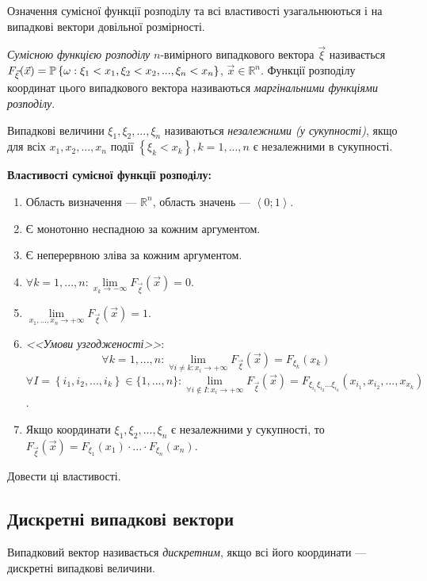 Означення сумісної функції розподілу та всі властивості узагальнюються і на випадкові вектори довільної розмірності.
\begin{definition} 
    \emph{Сумісною функцією розподілу} $n$-вимірного випадкового вектора $\vec{\xi}$ 
    називається $F_{\vec{\xi}}(\vec{x}) = \P\left\{\omega: \xi_1 < x_1, \xi_2 < x_2, ..., \xi_n < x_n\right\}$, $\vec{x} \in \mathbb{R}^n$.
    Функції розподілу координат цього випадкового вектора називаються \emph{маргінальними функціями розподілу}.
\end{definition}
\begin{definition}
    Випадкові величини $\xi_1, \xi_2, ..., \xi_n$ називаються
    \emph{незалежними (у сукупності)}, якщо для всіх
    $x_1, x_2, ... , x_n$
    події $\left\{\xi_k < x_k\right\}, k=1,...,n$ є незалежними в сукупності.
\end{definition}

\noindent\textbf{Властивості сумісної функції розподілу:}
\begin{enumerate}
    \item Область визначення --- $\mathbb{R}^n$, область значень --- $\left<0; 1\right>$.
    \item Є монотонно неспадною за кожним аргументом.
    \item Є неперервною зліва за кожним аргументом.
    \item $\forall k = 1,...,n: \underset{x_k \to -\infty}{\lim} F_{\vec{\xi}}(\vec{x}) = 0$.
    \item $\lim\limits_{x_1, ..., x_n \rightarrow +\infty} F_{\vec{\xi}}(\vec{x}) = 1$.
    \item \emph{<<Умови узгодженості>>}: 
        $$\forall k = 1,...,n: \lim\limits_{\forall i\neq k : x_i \to + \infty} F_{\vec{\xi}}(\vec{x}) = F_{\xi_k}(x_k)$$
        $$\forall I = \left\{i_1, i_2, ..., i_k\right\} \in \{1,...,n\}: 
        \lim\limits_{\forall i \notin I : x_i \to + \infty} F_{\vec{\xi}}(\vec{x}) =
        F_{\xi_{i_1} \xi_{i_2} ... \xi_{i_k}}(x_{i_1}, x_{i_2}, ..., x_{x_k})$$.
    \item Якщо координати $\xi_1, \xi_2, ..., \xi_n$ є незалежними у сукупності, то 
    $F_{\vec{\xi}}(\vec{x}) = F_{\xi_1}(x_1) \cdot ... \cdot F_{\xi_n}(x_n)$.
\end{enumerate}
\begin{exercise}
    Довести ці властивості.
\end{exercise}

\subsection{Дискретні випадкові вектори}
\begin{definition}
    Випадковий вектор називається \emph{дискретним}, якщо всі його координати --- 
    дискретні випадкові величини.
\end{definition}


